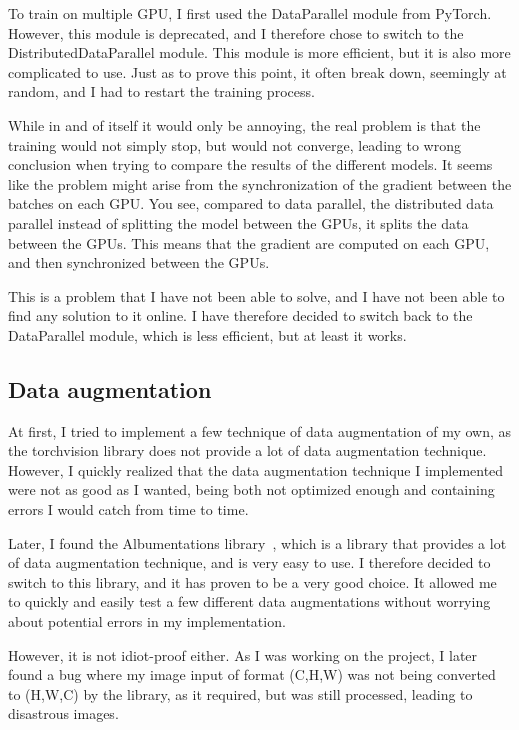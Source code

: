\documentclass[11pt]{article}
\begin{document}
        To train on multiple GPU, I first used the DataParallel module from PyTorch. However, this module is deprecated, and I therefore chose to switch to the DistributedDataParallel module. This module is more efficient, but it is also more complicated to use.
        Just as to prove this point, it often break down, seemingly at random, and I had to restart the training process.

        While in and of itself it would only be annoying, the real problem is that the training would not simply stop, but would not converge, leading to
        wrong conclusion when trying to compare the results of the different models. It seems like the problem might arise from the synchronization of the
        gradient between the batches on each GPU. You see, compared to data parallel, the distributed data parallel instead of splitting the model between the GPUs, it splits the data between the GPUs.
        This means that the gradient are computed on each GPU, and then synchronized between the GPUs.

        This is a problem that I have not been able to solve, and I have not been able to find any solution to it online. I have therefore decided to switch back to the DataParallel module, which is less efficient, but at least it works.


    \subsection{Data augmentation}


        At first, I tried to implement a few technique of data augmentation of my own, as the torchvision library does not provide a lot of data augmentation technique.
        However, I quickly realized that the data augmentation technique I implemented were not as good as I wanted, being both not optimized enough and containing errors I would catch from time to time.

        Later, I found the Albumentations library~\cite{albumentations}, which is a library that provides a lot of data augmentation technique, and is very easy to use. I therefore decided to switch to this library, and it has proven to be a very good choice.
        It allowed me to quickly and easily test a few different data augmentations without worrying about potential errors in my implementation.

        However, it is not idiot-proof either. As I was working on the project, I later found a bug where my image input of format (C,H,W) was not being converted to (H,W,C) by the library, as it required, but was still processed, leading to disastrous images.
\end{document}
